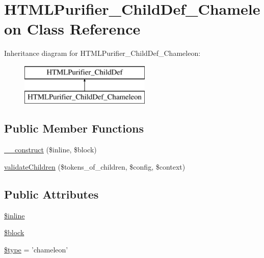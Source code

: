 \hypertarget{classHTMLPurifier__ChildDef__Chameleon}{\section{H\+T\+M\+L\+Purifier\+\_\+\+Child\+Def\+\_\+\+Chameleon Class Reference}
\label{classHTMLPurifier__ChildDef__Chameleon}
}
Inheritance diagram for H\+T\+M\+L\+Purifier\+\_\+\+Child\+Def\+\_\+\+Chameleon\+:\begin{figure}[H]
\begin{center}
\leavevmode
\includegraphics[height=2.000000cm]{classHTMLPurifier__ChildDef__Chameleon}
\end{center}
\end{figure}
\subsection*{Public Member Functions}
\begin{DoxyCompactItemize}
\item 
\hyperlink{classHTMLPurifier__ChildDef__Chameleon_a1fe7e20af1b07be0d66b7ea3f215457b}{\+\_\+\+\_\+construct} (\$inline, \$block)
\item 
\hyperlink{classHTMLPurifier__ChildDef__Chameleon_aee0a7d889e377fd44e5ddcec42749bff}{validate\+Children} (\$tokens\+\_\+of\+\_\+children, \$config, \$context)
\end{DoxyCompactItemize}
\subsection*{Public Attributes}
\begin{DoxyCompactItemize}
\item 
\hyperlink{classHTMLPurifier__ChildDef__Chameleon_a6d23ca5b2646f664a68362715bbfb384}{\$inline}
\item 
\hyperlink{classHTMLPurifier__ChildDef__Chameleon_aa442c7df577a378e265c6094cd226129}{\$block}
\item 
\hyperlink{classHTMLPurifier__ChildDef__Chameleon_a17b07005a3f864b5820f1e3fb8aea132}{\$type} = 'chameleon'
\end{DoxyCompactItemize}


